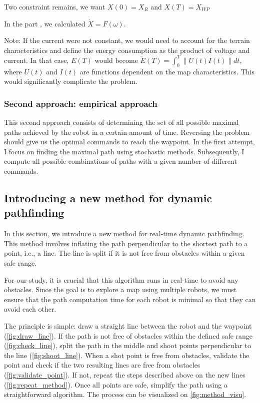 \documentclass[../main.tex]{subfiles}
\begin{document}
Two constraint remains, we want $X(0) = X_R$ and $X(T) = X_{WP}$

In the part \figtonum, we calculated $\dot{X} = F(\omega)$.

Note:
If the current were not constant, we would need to account for the terrain characteristics and define the energy consumption as the product of voltage and current. In that case, $E(T)$ would become $\tilde{E}(T) = \int_{0}^{T} \| U(t) I(t) \| dt$, where $U(t)$ and $I(t)$ are functions dependent on the map characteristics. This would significantly complicate the problem. 


\subsubsection{Second approach: empirical approach}

This second approach consists of determining the set of all possible maximal paths achieved by the robot in a certain amount of time. Reversing the problem should give us the optimal commands to reach the waypoint.
In the first attempt, I focus on finding the maximal path using stochastic methods. Subsequently, I compute all possible combinations of paths with a given number of different commands.



\subsection{Introducing a new method for dynamic pathfinding}

In this section, we introduce a new method for real-time dynamic pathfinding. This method involves inflating the path perpendicular to the shortest path to a point, i.e., a line. The line is split if it is not free from obstacles within a given safe range.

For our study, it is crucial that this algorithm runs in real-time to avoid any obstacles. Since the goal is to explore a map using multiple robots, we must ensure that the path computation time for each robot is minimal so that they can avoid each other.  

The principle is simple: draw a straight line between the robot and the waypoint (\autoref{fig:draw_line}). If the path is not free of obstacles within the defined safe range (\autoref{fig:check_line}), split the path in the middle and shoot points perpendicular to the line (\autoref{fig:shoot_line}). When a shot point is free from obstacles, validate the point and check if the two resulting lines are free from obstacles (\autoref{fig:validate_point}). If not, repeat the steps described above on the new lines (\autoref{fig:repeat_method}). Once all points are safe, simplify the path using a straightforward algorithm. The process can be visualized on \autoref{fig:method_visu}.
\end{document}
